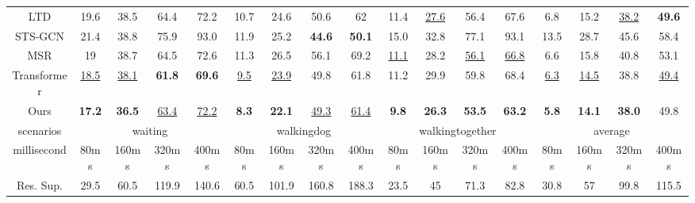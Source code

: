\begin{table}[h]
{\begin{tabular}{c|cccc|cccc|cccc|cccc}
LTD   & 19.6          & 38.5          & 64.4          & 72.2          & 10.7          & 24.6          & 50.6          & 62             & 11.4          & \underline{27.6}          & 56.4          & 67.6          & 6.8           & 15.2          & \underline{38.2}          & \textbf{49.6}          \\
STS-GCN       & 21.4          & 38.8          & 75.9          & 93.0          & 11.9          & 25.2          & \textbf{44.6}          & \textbf{50.1}           & 15.0          & 32.8          & 77.1          & 93.1          & 13.5          & 28.7          & 45.6          & 58.4          \\
MSR   & 19            & 38.7          & 64.5          & 72.6          & 11.3          & 26.5          & 56.1          & 69.2           & \underline{11.1}          & 28.2          & \underline{56.1}          & \underline{66.8}          & 6.6           & 15.8          & 40.8          & 53.1          \\
Transformer & \underline{18.5}          & \underline{38.1}          & \textbf{61.8} & \textbf{69.6} & \underline{9.5}           & \underline{23.9}          & 49.8          & 61.8           & 11.2          & 29.9          & 59.8          & 68.4          & \underline{6.3}           & \underline{14.5}          & 38.8          & \underline{49.4}          \\
Ours   & \textbf{17.2} & \textbf{36.5} & \underline{63.4}          & \underline{72.2}          & \textbf{8.3}  & \textbf{22.1} & \underline{49.3} & \underline{61.4}  & \textbf{9.8}  & \textbf{26.3} & \textbf{53.5} & \textbf{63.2} & \textbf{5.8}  & \textbf{14.1} & \textbf{38.0} & 49.8 \\ \hline
scenarios   & \multicolumn{4}{c|}{waiting}                                   & \multicolumn{4}{c|}{walkingdog}                                 & \multicolumn{4}{c|}{walkingtogether}                           & \multicolumn{4}{c}{average}                                       \\ \hline
millisecond & 80ms          & 160ms         & 320ms         & 400ms         & 80ms          & 160ms         & 320ms         & 400ms          & 80ms          & 160ms         & 320ms         & 400ms         & 80ms          & 160ms         & 320ms         & 400ms         \\ \hline
Res. Sup.   & 29.5          & 60.5          & 119.9         & 140.6         & 60.5          & 101.9         & 160.8         & 188.3          & 23.5          & 45            & 71.3          & 82.8          & 30.8          & 57            & 99.8          & 115.5         \\

\end{tabular}}
\end{table}
